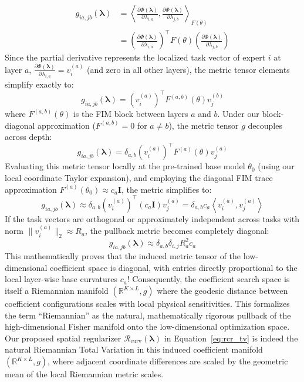 \begin{align}
g_{ia, jb}(\boldsymbol{\lambda}) &= \left\langle \frac{\partial \Phi(\boldsymbol{\lambda})}{\partial \lambda_{i, a}}, \frac{\partial \Phi(\boldsymbol{\lambda})}{\partial \lambda_{j, b}} \right\rangle_{F(\theta)} \nonumber \\
&= \left( \frac{\partial \Phi(\boldsymbol{\lambda})}{\partial \lambda_{i, a}} \right)^\top F(\theta) \left( \frac{\partial \Phi(\boldsymbol{\lambda})}{\partial \lambda_{j, b}} \right)
\end{align}
Since the partial derivative represents the localized task vector of expert $i$ at layer $a$, $\frac{\partial \Phi(\boldsymbol{\lambda})}{\partial \lambda_{i, a}} = v_i^{(a)}$ (and zero in all other layers), the metric tensor elements simplify exactly to:
\begin{equation}
g_{ia, jb}(\boldsymbol{\lambda}) = (v_i^{(a)})^\top F^{(a, b)}(\theta) v_j^{(b)}
\end{equation}
where $F^{(a, b)}(\theta)$ is the FIM block between layers $a$ and $b$. Under our block-diagonal approximation ($F^{(a, b)} = 0$ for $a \neq b$), the metric tensor $g$ decouples across depth:
\begin{equation}
g_{ia, jb}(\boldsymbol{\lambda}) = \delta_{a, b} (v_i^{(a)})^\top F^{(a)}(\theta) v_j^{(a)}
\end{equation}
Evaluating this metric tensor locally at the pre-trained base model $\theta_0$ (using our local coordinate Taylor expansion), and employing the diagonal FIM trace approximation $F^{(a)}(\theta_0) \approx c_a \mathbf{I}$, the metric simplifies to:
\begin{equation}
g_{ia, jb}(\boldsymbol{\lambda}) \approx \delta_{a, b} (v_i^{(a)})^\top (c_a \mathbf{I}) v_j^{(a)} = \delta_{a, b} c_a \left\langle v_i^{(a)}, v_j^{(a)} \right\rangle
\end{equation}
If the task vectors are orthogonal or approximately independent across tasks with norm $\|v_i^{(a)}\|_2 \approx R_a$, the pullback metric becomes completely diagonal:
\begin{equation}
g_{ia, jb}(\boldsymbol{\lambda}) \approx \delta_{a, b} \delta_{i, j} R_a^2 c_a
\end{equation}
This mathematically proves that the induced metric tensor of the low-dimensional coefficient space is diagonal, with entries directly proportional to the local layer-wise base curvatures $c_a$! Consequently, the coefficient search space is itself a Riemannian manifold $(\mathbb{R}^{K \times L}, g)$ where the geodesic distance between coefficient configurations scales with local physical sensitivities. This formalizes the term ``Riemannian'' as the natural, mathematically rigorous pullback of the high-dimensional Fisher manifold onto the low-dimensional optimization space. Our proposed spatial regularizer $\mathcal{R}_{\text{curv}}(\boldsymbol{\lambda})$ in Equation~\ref{eq:rcr_tv} is indeed the natural Riemannian Total Variation in this induced coefficient manifold $(\mathbb{R}^{K \times L}, g)$, where adjacent coordinate differences are scaled by the geometric mean of the local Riemannian metric scales.

